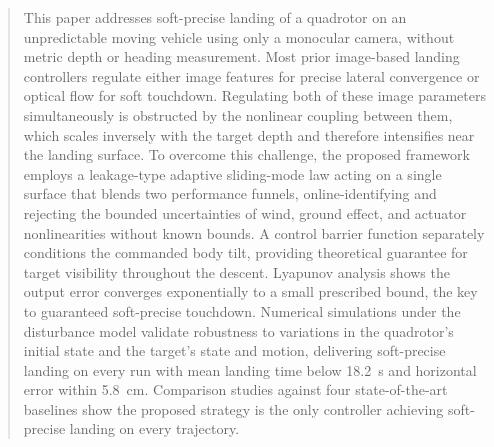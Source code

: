 \documentclass{IEEEtaes}
\begin{document}
\begin{abstract}This paper addresses soft-precise landing of a quadrotor on an unpredictable moving vehicle using only a monocular camera, without metric depth or heading measurement. Most prior image-based landing controllers regulate either image features for precise lateral convergence or optical flow for soft touchdown. Regulating both of these image parameters simultaneously is obstructed by the nonlinear coupling between them, which scales inversely with the target depth and therefore intensifies near the landing surface. To overcome this challenge, the proposed framework employs a leakage-type adaptive sliding-mode law acting on a single surface that blends two performance funnels, online-identifying and rejecting the bounded uncertainties of wind, ground effect, and actuator nonlinearities without known bounds. A control barrier function separately conditions the commanded body tilt, providing theoretical guarantee for target visibility throughout the descent. Lyapunov analysis shows the output error converges exponentially to a small prescribed bound, the key to guaranteed soft-precise touchdown. Numerical simulations under the disturbance model validate robustness to variations in the quadrotor's initial state and the target's state and motion, delivering soft-precise landing on every run with mean landing time below 18.2~s and horizontal error within 5.8~cm. Comparison studies against four state-of-the-art baselines show the proposed strategy is the only controller achieving soft-precise landing on every trajectory.
\end{abstract}

\end{document}
